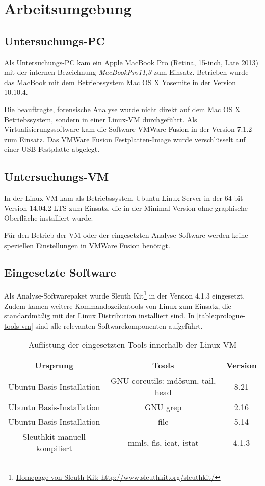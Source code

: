 \section{Arbeitsumgebung}
\label{sec:env}

\subsection{Untersuchungs-PC}
Als Untersuchungs-PC kam ein Apple MacBook Pro (Retina, 15-inch, Late 2013) mit der  internen Bezeichnung \textit{MacBookPro11,3} zum Einsatz. Betrieben wurde das MacBook mit dem Betriebssystem Mac OS X Yosemite in der Version 10.10.4.

Die beauftragte, forensische Analyse wurde nicht direkt auf dem Mac OS X Betriebssystem, sondern in einer Linux-VM durchgeführt. Als Virtualisierungssoftware kam die Software VMWare Fusion in der Version 7.1.2 zum Einsatz. Das VMWare Fusion Festplatten-Image wurde verschlüsselt auf einer USB-Festplatte abgelegt.

\subsection{Untersuchungs-VM}

In der Linux-VM kam als Betriebssystem Ubuntu Linux Server in der 64-bit Version 14.04.2 LTS zum Einsatz, die in der Minimal-Version ohne graphische Oberfläche installiert wurde. 

Für den Betrieb der VM oder der eingesetzten Analyse-Software werden keine speziellen Einstellungen in VMWare Fusion benötigt.

\subsection{Eingesetzte Software}

Als Analyse-Softwarepaket wurde Sleuth Kit\footnote{\href{http://www.sleuthkit.org/sleuthkit/}{Homepage von Sleuth Kit: http://www.sleuthkit.org/sleuthkit/}} in der Version 4.1.3 eingesetzt. Zudem kamen weitere Kommandozeilentools von Linux zum Einsatz, die standardmäßig mit der Linux Distribution installiert sind. In \autoref{table:prologue-tools-vm} sind alle relevanten Softwarekomponenten aufgeführt.

\begin{table}[H]
\centering
\begin{tabular}{ccc}
\hline 
Ursprung & Tools & Version \\ 
\hline 
Ubuntu Basis-Installation & GNU coreutils: md5sum, tail, head & 8.21 \\ 
\hline 
Ubuntu Basis-Installation & GNU grep & 2.16 \\ 
\hline 
Ubuntu Basis-Installation & file & 5.14 \\ 
\hline 
Sleuthkit manuell kompiliert & mmls, fls, icat, istat & 4.1.3 \\ 
\hline 
\end{tabular} 
\caption{Auflistung der eingesetzten Tools innerhalb der Linux-VM}
\label{table:prologue-tools-vm}
\end{table}

